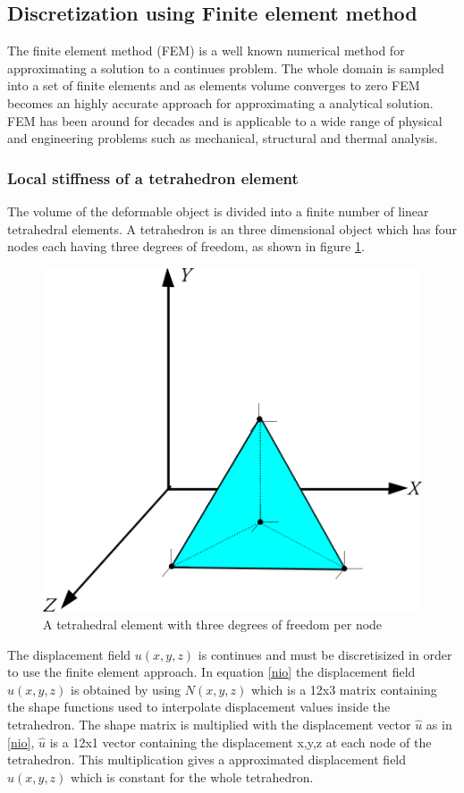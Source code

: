 \documentclass[10pt,a4paper]{article}
\begin{document}
\subsection{Discretization using Finite element method}
The finite element method (FEM) is a well known numerical method for approximating a solution to a continues problem. The whole domain is sampled into a set of finite elements and as elements volume converges to zero FEM becomes an highly accurate approach for approximating a analytical solution. FEM has been around for decades and is applicable to a wide range of physical and engineering problems such as mechanical, structural and thermal analysis.

\subsubsection{Local stiffness of a tetrahedron element}\label{sec:localstiffness}
The volume of the deformable object is divided into a finite number of linear tetrahedral elements. A tetrahedron is an three dimensional object which has four nodes each having three degrees of freedom, as shown in figure \ref{fig:tetracoord}.

\begin{figure}[htpb]
\centering
\includegraphics[width=.3\columnwidth]{figures/tetra_coord.png}
\caption{A tetrahedral element with three degrees of freedom per node}
\label{fig:tetracoord}
\end{figure}

The displacement field $u(x,y,z)$ is continues and must be discretisized in order to use the finite element approach. In equation \ref{nio} the displacement field $u(x,y,z)$ is obtained by using $N(x,y,z)$ which is a 12x3 matrix containing the shape functions used to interpolate displacement values inside the tetrahedron. The shape matrix is multiplied with the displacement vector $\hat{u}$ as in \ref{nio}, $\hat{u}$ is a 12x1 vector containing the displacement x,y,z at each node of the tetrahedron. This multiplication gives a approximated displacement field $u(x,y,z)$ which is constant for the whole tetrahedron.
\end{document}
